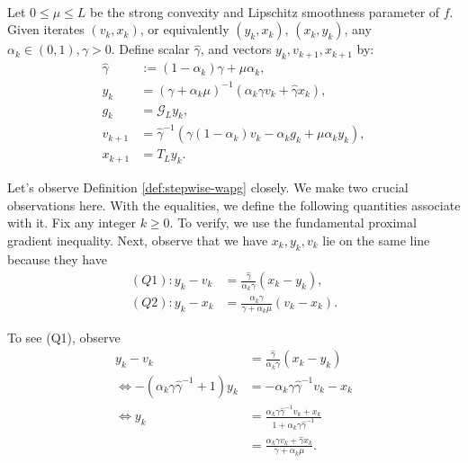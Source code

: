 \documentclass[12pt]{article}
\begin{document}
    
    \begin{theorem}\label{def:stepwise-wapg}\;\\
        Let $0 \le \mu \le L$ be the strong convexity and Lipschitz smoothness parameter of $f$. 
        Given iterates $(v_k, x_k)$, or equivalently $(y_k, x_k)$, $(x_k, y_k)$, any $\alpha_k \in (0, 1), \gamma > 0$. 
        Define scalar $\hat \gamma$, and vectors $y_k, v_{k + 1}, x_{k + 1}$ by: 
        \begin{align*}
            \hat \gamma &:= (1 - \alpha_k)\gamma + \mu \alpha_k, 
            \\
            y_k &= 
            (\gamma + \alpha_k \mu)^{-1}(\alpha_k \gamma v_k + \hat\gamma x_k), 
            \\
            g_k &= \mathcal G_L y_k, 
            \\
            v_{k + 1} &= \hat\gamma^{-1}
            (\gamma(1 - \alpha_k) v_k - \alpha_k g_k + \mu \alpha_k y_k), 
            \\
            x_{k + 1} &= T_L y_k. 
        \end{align*}
    \end{theorem}
    \begin{observation}\label{obs:stepwise-wapg}
        Let's observe Definition \ref{def:stepwise-wapg} closely. 
        We make two crucial observations here. 
        With the equalities, we define the following quantities associate with it. 
        Fix any integer $k \ge 0$. 
        To verify, we use the fundamental proximal gradient inequality. 
        Next, observe that we have $x_k, y_k, v_k$ lie on the same line because they have 
        \begin{align*}
            (Q1): 
            y_k - v_k &= 
            \frac{\hat \gamma}{\alpha_k \gamma}(x_k - y_k),
            \\
            (Q2): 
            y_k - x_k &= 
            \frac{\alpha_k \gamma}{\gamma + \alpha_k \mu}(v_k - x_k). 
        \end{align*}
    \end{observation}
        To see (Q1), observe 
        \begin{align*}
            y_k - v_k &= 
            \frac{\hat \gamma}{\alpha_k \gamma}(x_k - y_k)
            \\
            \iff 
            -(\alpha_k \gamma\hat \gamma^{-1} + 1)y_k
            &= 
            - \alpha_k \gamma \hat \gamma^{-1}v_k - x_k
            \\
            \iff 
            y_k &= 
            \frac{
                \alpha_k \gamma \hat \gamma^{-1}v_k + x_k
            }{1 + \alpha_k \gamma \hat \gamma^{-1}}
            \\
            &=  
            \frac{\alpha_k \gamma v_k + \hat \gamma x_k}{\gamma + \alpha_k \mu}.
        \end{align*}
\end{document}
